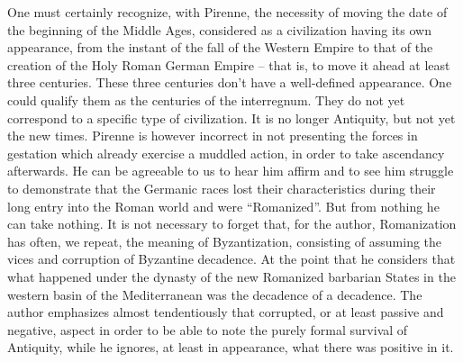 One must certainly recognize, with Pirenne, the necessity of moving the date of the beginning of the Middle Ages, considered as a civilization having its own appearance, from the instant of the fall of the Western Empire to that of the creation of the Holy Roman German Empire -- that is, to move it ahead at least three centuries. These three centuries don't have a well-defined appearance. One could qualify them as the centuries of the interregnum. They do not yet correspond to a specific type of civilization. It is no longer Antiquity, but not yet the new times. Pirenne is however incorrect in not presenting the forces in gestation which already exercise a muddled action, in order to take ascendancy afterwards. He can be agreeable to us to hear him affirm and to see him struggle to demonstrate that the Germanic races lost their characteristics during their long entry into the Roman world and were ``Romanized''. But from nothing he can take nothing. It is not necessary to forget that, for the author, Romanization has often, we repeat, the meaning of Byzantization, consisting of assuming the vices and corruption of Byzantine decadence. At the point that he considers that what happened under the dynasty of the new Romanized barbarian States in the western basin of the Mediterranean was the decadence of a decadence. The author emphasizes almost tendentiously that corrupted, or at least passive and negative, aspect in order to be able to note the purely formal survival of Antiquity, while he ignores, at least in appearance, what there was positive in it.

